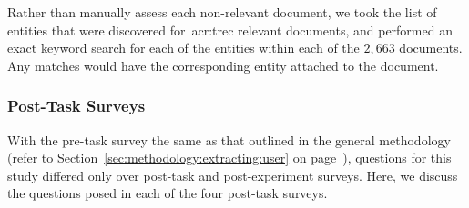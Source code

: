 Rather than manually assess each non-relevant document, we took the list of entities that were discovered for~\gls{acr:trec} relevant documents, and performed an exact keyword search for each of the entities within each of the $2,663$ documents. Any matches would have the corresponding entity attached to the document.

%
%

\subsubsection{Post-Task Surveys}\label{sec:diversity:users:posttask}
With the pre-task survey the same as that outlined in the general methodology (refer to Section~\ref{sec:methodology:extracting:user} on page~\pageref{sec:methodology:extracting:user}), questions for this study differed only over post-task and post-experiment surveys. Here, we discuss the questions posed in each of the four post-task surveys.

